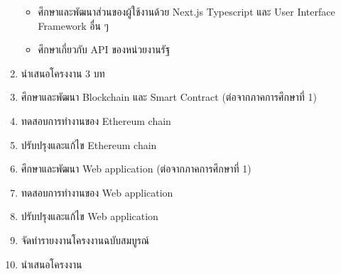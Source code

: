 \documentclass[12pt,oneside,openright,a4paper]{cpe-thai-project}
\begin{document}
\begin{enumerate}
	\begin{itemize}
		\item ศึกษาและพัฒนาส่วนของผู้ใช้งานด้วย Next.js Typescript และ User Interface Framework อื่น ๆ 
		\item ศึกษาเกี่ยวกับ API ของหน่วยงานรัฐ
	\end{itemize}
\item นำเสนอโครงงาน 3 บท
\item ศึกษาและพัฒนา Blockchain และ Smart Contract (ต่อจากภาคการศึกษาที่ 1)
\item ทดสอบการทำงานของ Ethereum chain
\item ปรับปรุงและแก้ไข Ethereum chain
\item ศึกษาและพัฒนา Web application (ต่อจากภาคการศึกษาที่ 1)
\item ทดสอบการทำงานของ Web application
\item ปรับปรุงและแก้ไข Web application
\item จัดทำรายงงานโครงงานฉบับสมบูรณ์
\item นำเสนอโครงงาน
\end{enumerate}
\end{document}
